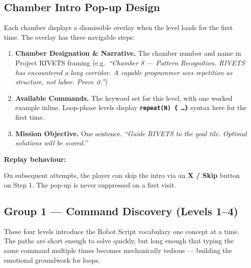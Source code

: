 \documentclass[12pt,a4paper]{article}
\newcommand{\keyword}[1]{\textcolor{keyword}{\texttt{\bfseries #1}}}
\newcommand{\gddfield}[2]{%
  \noindent\begin{minipage}[t]{3.5cm}\bfseries\color{accent}\sffamily#1\end{minipage}%
  \hspace{8pt}%
  \begin{minipage}[t]{\dimexpr\linewidth-3.5cm-8pt\relax}%
    #2
  \end{minipage}\par\smallskip}
\begin{document}
\subsection{Chamber Intro Pop-up Design}

\begin{tcolorbox}[gddbox, title={Level Intro Pop-up — Structure}]
Each chamber displays a dismissible overlay when the level loads for the first time. The overlay has three navigable steps:

\vspace{4pt}
\begin{enumerate}[label=\textbf{Step \arabic*.}, leftmargin=3.5em, noitemsep]
  \item \textbf{Chamber Designation \& Narrative.} The chamber number and name in Project RIVETS framing (e.g.\ \emph{``Chamber 8 — Pattern Recognition. RIVETS has encountered a long corridor. A capable programmer sees repetition as structure, not labor. Prove it.''})
  \item \textbf{Available Commands.} The keyword set for this level, with one worked example inline. Loop-phase levels display \keyword{repeat(N) \{ \ldots \}} syntax here for the first time.
  \item \textbf{Mission Objective.} One sentence. \emph{``Guide RIVETS to the goal tile. Optimal solutions will be scored.''}
\end{enumerate}

\vspace{4pt}
\gddfield{Replay behaviour:}{On subsequent attempts, the player can skip the intro via an \textbf{X / Skip} button on Step 1. The pop-up is never suppressed on a first visit.}
\end{tcolorbox}

\subsection{Group 1 — Command Discovery (Levels 1--4)}

\begin{tcolorbox}[gddbox, title={Group Design Note}]
These four levels introduce the Robot Script vocabulary one concept at a time. The paths are short enough to solve quickly, but long enough that typing the same command multiple times becomes mechanically tedious — building the emotional groundwork for loops.
\end{tcolorbox}
\end{document}
